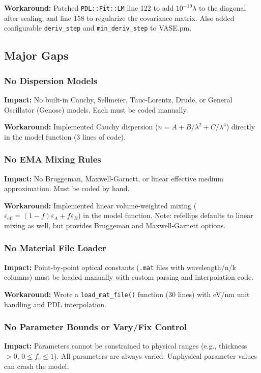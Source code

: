 \documentclass[11pt]{article}
\begin{document}
\textbf{Workaround:} Patched \texttt{PDL::Fit::LM} line 122 to add
$10^{-10}\lambda$ to the diagonal after scaling, and line 158 to
regularize the covariance matrix. Also added configurable
\texttt{deriv\_step} and \texttt{min\_deriv\_step} to VASE.pm.

\subsection{Major Gaps}

\subsubsection{No Dispersion Models}
\textbf{Impact:} No built-in Cauchy, Sellmeier, Tauc-Lorentz, Drude,
or General Oscillator (Genosc) models. Each must be coded manually.

\textbf{Workaround:} Implemented Cauchy dispersion ($n = A + B/\lambda^2 + C/\lambda^4$)
directly in the model function (3 lines of code).

\subsubsection{No EMA Mixing Rules}
\textbf{Impact:} No Bruggeman, Maxwell-Garnett, or linear effective
medium approximation. Must be coded by hand.

\textbf{Workaround:} Implemented linear volume-weighted mixing
($\varepsilon_\text{eff} = (1-f)\varepsilon_A + f\varepsilon_B$) in
the model function. Note: refellips defaults to linear mixing as well,
but provides Bruggeman and Maxwell-Garnett options.

\subsubsection{No Material File Loader}
\textbf{Impact:} Point-by-point optical constants (\texttt{.mat} files
with wavelength/n/k columns) must be loaded manually with custom parsing
and interpolation code.

\textbf{Workaround:} Wrote a \texttt{load\_mat\_file()} function (30 lines)
with eV/nm unit handling and PDL interpolation.

\subsubsection{No Parameter Bounds or Vary/Fix Control}
\textbf{Impact:} Parameters cannot be constrained to physical ranges
(e.g., thickness $> 0$, $0 \le f_v \le 1$). All parameters are always
varied. Unphysical parameter values can crash the model.
\end{document}
